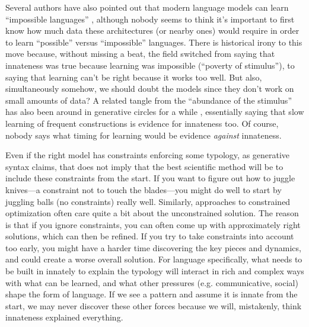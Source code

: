 \documentclass[output=paper,colorlinks,citecolor=brown
]{langscibook}
\begin{document}
Several authors have also pointed out that modern language models can learn ``impossible languages'' \citep{milway2023response,moro2023large}, although nobody seems to think it's important to first know how much data these architectures (or nearby ones) would require in order to learn ``possible'' versus ``impossible'' languages. There is historical irony to this move because, without missing a beat, the field switched from saying that innateness was true because learning was impossible (``poverty of stimulus''), to saying that learning can't be right because it works too well. But also, simultaneously somehow, we should doubt the models since they don't work  on small amounts of data? A related tangle from the ``abundance of the stimulus'' has also been around in generative circles for a while \citep{babyonyshev2001maturation}, essentially saying that slow learning of frequent constructions is evidence for innateness too.  Of course, nobody says what timing for learning would be evidence \emph{against} innateness. 

Even if the right model has constraints enforcing some typology, as generative syntax claims, that does not imply that the best scientific method will be to include these constraints from the start. If you want to figure out how to juggle knives---a constraint not to touch the blades---you might do well to start by juggling balls (no constraints) really well. Similarly, approaches to constrained optimization often care quite a bit about the unconstrained solution. The reason is that if you ignore constraints, you can often come up with approximately right solutions, which can then be refined. If you try to take constraints into account too early, you might have a harder time discovering the key pieces and dynamics, and could create a worse overall solution. For language specifically, what needs to be built in innately to explain the typology will interact in rich and complex ways with what can be learned, and what other pressures (e.g. communicative, social) shape the form of language. If we see a pattern and assume it is innate from the start, we may never discover these other forces because we will, mistakenly, think innateness explained everything. %
\end{document}
